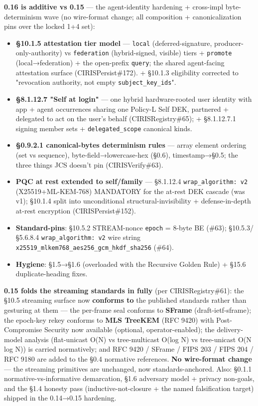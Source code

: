 \documentclass[10pt]{article}
\begin{document}
\textbf{0.16 is additive vs 0.15} — the agent-identity hardening + cross-impl byte-determinism wave (no wire-format change; all composition + canonicalization pins over the locked 1+4 set):

\begin{itemize}\setlength\itemsep{0pt}
\item \textbf{§10.1.5 attestation tier model} — \texttt{local} (deferred-signature, producer-only-authority) vs \texttt{federation} (hybrid-signed, visible) tiers + \texttt{promote} (local→federation) + the open-prefix \texttt{query}; the shared agent-facing attestation surface (CIRISPersist\#172). + §10.1.3 eligibility corrected to "revocation authority, not empty \texttt{subject\_key\_ids}".
\item \textbf{§8.1.12.7 "Self at login"} — one hybrid hardware-rooted user identity with app + agent occurrences sharing one Policy-L Self DEK, partnered + delegated to act on the user's behalf (CIRISRegistry\#65); + §8.1.12.7.1 signing member sets + \texttt{delegated\_scope} canonical kinds.
\item \textbf{§0.9.2.1 canonical-bytes determinism rules} — array element ordering (set vs sequence), byte-field→lowercase-hex (§0.6), timestamp→§0.5; the three things JCS doesn't pin (CIRISVerify\#63).
\item \textbf{PQC at rest extended to self/family} — §8.1.12.4 \texttt{wrap\_algorithm: v2} (X25519+ML-KEM-768) MANDATORY for the at-rest DEK cascade (was v1); §10.1.4 split into unconditional structural-invisibility + defense-in-depth at-rest encryption (CIRISPersist\#152).
\item \textbf{Standard-pins}: §10.5.2 STREAM-nonce \texttt{epoch} = 8-byte BE (\#63); §10.5.3/§5.6.8.4 \texttt{wrap\_algorithm: v2} wire string \texttt{x25519\_mlkem768\_aes256\_gcm\_hkdf\_sha256} (\#64).
\item \textbf{Hygiene}: §1.5→§1.6 (overloaded with the Recursive Golden Rule) + §15.6 duplicate-heading fixes.
\end{itemize}


\textbf{0.15 folds the streaming standards in fully} (per CIRISRegistry\#61): the §10.5 streaming surface now \textbf{conforms to} the published standards rather than gesturing at them — the per-frame seal conforms to \textbf{SFrame} (draft-ietf-sframe); the epoch-key rekey conforms to \textbf{MLS TreeKEM} (RFC 9420) with Post-Compromise Security now available (optional, operator-enabled); the delivery-model analysis (flat-unicast O(N) vs tree-multicast O(log N) vs tree-unicast O(N log N)) is carried normatively; and RFC 9420 / SFrame / FIPS 203 / FIPS 204 / RFC 9180 are added to the §0.4 normative references. \textbf{No wire-format change} — the streaming primitives are unchanged, now standards-anchored. Also: §0.1.1 normative-vs-informative demarcation, §1.6 adversary model + privacy non-goals, and the §1.4 honesty pass (inductive-not-closure + the named falsification target) shipped in the 0.14→0.15 hardening.
\end{document}
